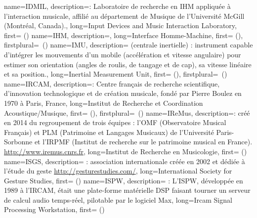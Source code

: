 {
    name={IDMIL},
    description={\textit{}: Laboratoire de recherche en \gls{IHM} appliquée à l'interaction musicale, affilié au département de Musique de l'Université McGill (Montréal, Canada).},
    long={Input Devices and Music Interaction Laboratory},
    first={ ()}
}
{
    name={IHM},
    description={\textit{}},
    long={Interface Homme-Machine},
    first={ ()},
    firstplural={\glspluralsuffix\ (\glspluralsuffix)}
}
{
    name={IMU},
    description={\textit{} (centrale inertielle) : instrument capable d'intégrer les mouvements d'un mobile (accélération et vitesse angulaire) pour estimer son orientation (angles de roulis, de tangage et de cap), sa vitesse linéaire et sa position.},
    long={Inertial Measurement Unit},
    first={ ()},
    firstplural={\glspluralsuffix\ (\glspluralsuffix)}
}
{
    name={IRCAM},
    description={\textit{}: Centre français de recherche scientifique, d'innovation technologique et de création musicale, fondé par Pierre Boulez en 1970 à Paris, France},
    long={Institut de Recherche et Coordination Acoustique/Musique},
    first={ ()},
    firstplural={\glspluralsuffix\ (\glspluralsuffix)}
}
{
    name={IReMus},
    description={\textit{}: créé en 2014 du regroupement de trois équipes : l'OMF (Observatoire Musical Français) et PLM (Patrimoine et Langages Musicaux) de l’Université Paris-Sorbonne et l’IRPMF (Institut de recherche sur le patrimoine musical en France). \url{http://www.iremus.cnrs.fr}},
    long={Institut de Recherche en Musicologie},
    first={ ()}
}
{
    name={ISGS},
    description={\textit{} : association internationale créée en 2002 et dédiée à l'étude du geste \url{http://gesturestudies.com/}},
    long={International Society for Gesture Studies},
    first={ ()}
}
{
    name={ISPW},
    description={\textit{} : L'ISPW, développée en 1989 à l'\gls{IRCAM}, était une plate-forme matérielle \gls{DSP} faisant tourner un serveur de calcul audio temps-réel, pilotable par le logiciel Max},
    long={Ircam Signal Processing Workstation},
    first={ ()}
}
